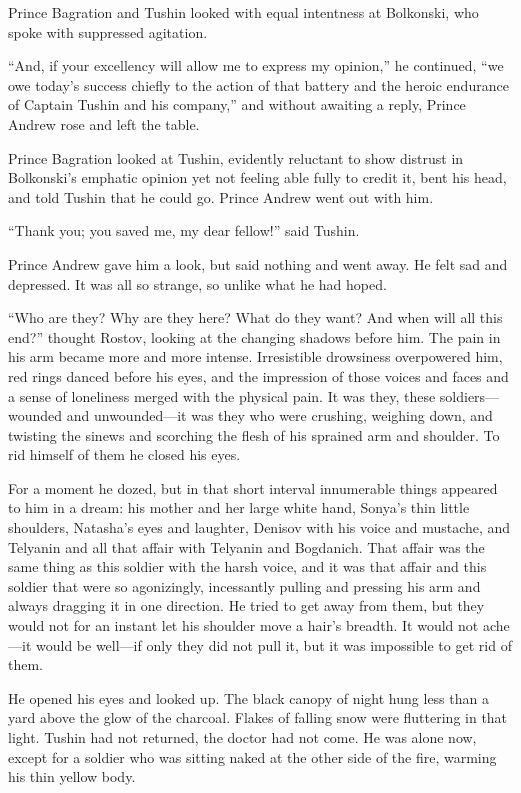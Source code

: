 Prince Bagration and Tushin looked with equal intentness at
Bolkonski, who spoke with suppressed agitation.

``And, if your excellency will allow me to express my opinion,''
he continued, ``we owe today's success chiefly to the action of
that battery and the heroic endurance of Captain Tushin and his
company,'' and without awaiting a reply, Prince Andrew rose and
left the table.

Prince Bagration looked at Tushin, evidently reluctant to show
distrust in Bolkonski's emphatic opinion yet not feeling able
fully to credit it, bent his head, and told Tushin that he could
go. Prince Andrew went out with him.

``Thank you; you saved me, my dear fellow!'' said Tushin.

Prince Andrew gave him a look, but said nothing and went away. He
felt sad and depressed. It was all so strange, so unlike what he
had hoped.

``Who are they? Why are they here? What do they want? And when
will all this end?'' thought Rostov, looking at the changing
shadows before him.  The pain in his arm became more and more
intense. Irresistible drowsiness overpowered him, red rings
danced before his eyes, and the impression of those voices and
faces and a sense of loneliness merged with the physical pain. It
was they, these soldiers---wounded and unwounded---it was they
who were crushing, weighing down, and twisting the sinews and
scorching the flesh of his sprained arm and shoulder. To rid
himself of them he closed his eyes.

For a moment he dozed, but in that short interval innumerable
things appeared to him in a dream: his mother and her large white
hand, Sonya's thin little shoulders, Natasha's eyes and laughter,
Denisov with his voice and mustache, and Telyanin and all that
affair with Telyanin and Bogdanich. That affair was the same
thing as this soldier with the harsh voice, and it was that
affair and this soldier that were so agonizingly, incessantly
pulling and pressing his arm and always dragging it in one
direction. He tried to get away from them, but they would not for
an instant let his shoulder move a hair's breadth. It would not
ache---it would be well---if only they did not pull it, but it
was impossible to get rid of them.

He opened his eyes and looked up. The black canopy of night hung
less than a yard above the glow of the charcoal. Flakes of
falling snow were fluttering in that light. Tushin had not
returned, the doctor had not come. He was alone now, except for a
soldier who was sitting naked at the other side of the fire,
warming his thin yellow body.

